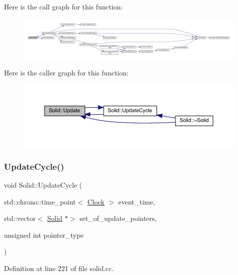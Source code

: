 Here is the call graph for this function\+:
\nopagebreak
\begin{figure}[H]
\begin{center}
\leavevmode
\includegraphics[width=350pt]{class_solid_a248a5eab9fa0c584af7cdec2f86dc3a3_cgraph}
\end{center}
\end{figure}
Here is the caller graph for this function\+:
\nopagebreak
\begin{figure}[H]
\begin{center}
\leavevmode
\includegraphics[width=350pt]{class_solid_a248a5eab9fa0c584af7cdec2f86dc3a3_icgraph}
\end{center}
\end{figure}
\mbox{\label{class_solid_a17239817eba0e5870454311857dca736}} 
\subsubsection{\texorpdfstring{Update\+Cycle()}{UpdateCycle()}}
{\footnotesize\ttfamily void Solid\+::\+Update\+Cycle (\begin{DoxyParamCaption}\item[{std\+::chrono\+::time\+\_\+point$<$ \hyperlink{universe_8h_a0ef8d951d1ca5ab3cfaf7ab4c7a6fd80}{Clock} $>$}]{event\+\_\+time,  }\item[{std\+::vector$<$ \hyperlink{class_solid}{Solid} $\ast$$>$}]{set\+\_\+of\+\_\+update\+\_\+pointers,  }\item[{unsigned int}]{pointer\+\_\+type }\end{DoxyParamCaption})}



Definition at line 221 of file solid.\+cc.


